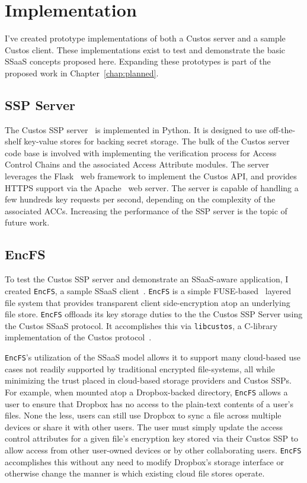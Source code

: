 \section{Implementation}

I've created prototype implementations of both a Custos server and a
sample Custos client. These implementations exist to test and
demonstrate the basic SSaaS concepts proposed here. Expanding these
prototypes is part of the proposed work in Chapter~\ref{chap:planned}.

\subsection{SSP Server}

The Custos SSP server~\cite{custos-repo-server} is implemented in
Python. It is designed to use off-the-shelf key-value stores for
backing secret storage. The bulk of the Custos server code base is
involved with implementing the verification process for Access Control
Chains and the associated Access Attribute modules. The server
leverages the Flask~\cite{python-flask} web framework to implement the
Custos API, and provides HTTPS support via the Apache~\cite{apache}
web server. The server is capable of handling a few hundreds key
requests per second, depending on the complexity of the associated
ACCs. Increasing the performance of the SSP server is the topic of
future work.

\subsection{EncFS}

To test the Custos SSP server and demonstrate an SSaaS-aware
application, I created \texttt{EncFS}, a sample SSaaS
client~\cite{custos-repo-encfs}. \texttt{EncFS} is a simple
FUSE-based~\cite{fuse} layered file system that provides transparent
client side-encryption atop an underlying file store. \texttt{EncFS}
offloads its key storage duties to the the Custos SSP Server using the
Custos SSaaS protocol. It accomplishes this via \texttt{libcustos}, a
C-library implementation of the Custos
protocol~\cite{custos-repo-libcustos}.

\texttt{EncFS}'s utilization of the SSaaS model allows it to support
many cloud-based use cases not readily supported by traditional
encrypted file-systems, all while minimizing the trust placed in
cloud-based storage providers and Custos SSPs. For example, when
mounted atop a Dropbox-backed directory, \texttt{EncFS} allows a user
to ensure that Dropbox has no access to the plain-text contents of a
user's files. None the less, users can still use Dropbox to sync a
file across multiple devices or share it with other users. The user
must simply update the access control attributes for a given file's
encryption key stored via their Custos SSP to allow access from other
user-owned devices or by other collaborating users. \texttt{EncFS}
accomplishes this without any need to modify Dropbox's storage
interface or otherwise change the manner is which existing cloud file
stores operate.

